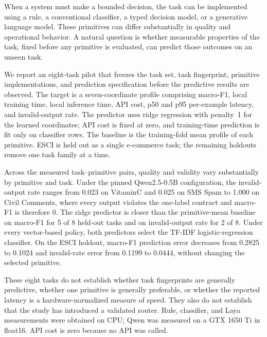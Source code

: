 When a system must make a bounded decision, the task can be implemented using a rule, a conventional classifier, a typed decision model, or a generative language model. These primitives can differ substantially in quality and operational behavior. A natural question is whether measurable properties of the task, fixed before any primitive is evaluated, can predict those outcomes on an unseen task.

We report an eight-task pilot that freezes the task set, task fingerprint, primitive implementations, and prediction specification before the predictive results are observed. The target is a seven-coordinate profile comprising macro-F1, local training time, local inference time, API cost, p50 and p95 per-example latency, and invalid-output rate. The predictor uses ridge regression with penalty~1 for the learned coordinates; API cost is fixed at zero, and training-time prediction is fit only on classifier rows. The baseline is the training-fold mean profile of each primitive. ESCI is held out as a single e-commerce task; the remaining holdouts remove one task family at a time.

Across the measured task--primitive pairs, quality and validity vary substantially by primitive and task. Under the pinned Qwen2.5-0.5B configuration, the invalid-output rate ranges from 0.023 on VitaminC and 0.025 on SMS Spam to 1.000 on Civil Comments, where every output violates the one-label contract and macro-F1 is therefore 0. The ridge predictor is closer than the primitive-mean baseline on macro-F1 for 5 of 8 held-out tasks and on invalid-output rate for 2 of 8. Under every vector-based policy, both predictors select the TF-IDF logistic-regression classifier. On the ESCI holdout, macro-F1 prediction error decreases from 0.2825 to 0.1024 and invalid-rate error from 0.1199 to 0.0444, without changing the selected primitive.

These eight tasks do not establish whether task fingerprints are generally predictive, whether one primitive is generally preferable, or whether the reported latency is a hardware-normalized measure of speed. They also do not establish that the study has introduced a validated router. Rule, classifier, and Laya measurements were obtained on CPU; Qwen was measured on a GTX 1650 Ti in float16. API cost is zero because no API was called.
